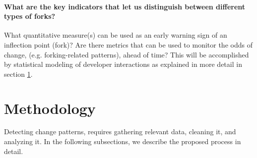 \documentclass[11pt]{report}
\begin{document}
\paragraph*{\hspace{4 mm} What are the key indicators that let us distinguish between different types of forks?\\}

What quantitative measure(s) can be used as an early warning sign of an inflection point (fork)? Are there metrics that can be used to monitor the odds of change, (e.g. forking-related patterns), ahead of time? This will be accomplished by statistical modeling of developer interactions as explained in more detail in section \ref{methodology}.

%
%

\pagebreak

\section{Methodology}
\label{methodology}

Detecting change patterns, requires gathering  relevant data, cleaning it, and analyzing it. In the following subsections, we describe the proposed process in detail. 
\end{document}
